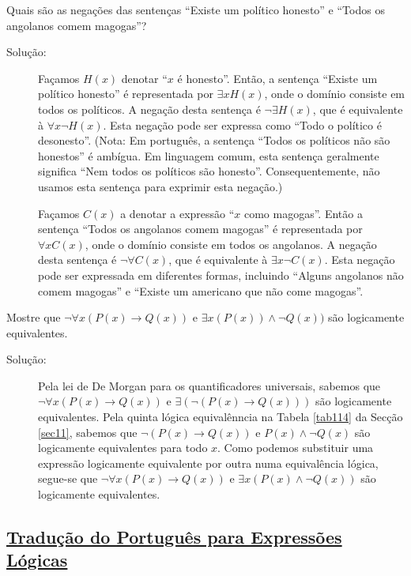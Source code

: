 \begin{exmp}
\label{exem144}
Quais são as negações das sentenças ``Existe um político honesto'' e ``Todos os
angolanos comem magogas''?
\begin{description}
\item[Solução:] Façamos $H(x)$ denotar ``$x$ é honesto''. Então, a sentença
``Existe um político honesto'' é representada por $\exists xH(x)$, onde o
domínio consiste em todos os políticos. A negação desta sentença é
$\lnot\exists H(x)$, que é equivalente à $\forall x\lnot H(x)$. Esta negação
pode ser expressa como ``Todo o político é desonesto''. (Nota: Em português, a
sentença ``Todos os políticos não são honestos'' é ambígua. Em linguagem comum,
esta sentença geralmente significa ``Nem todos os políticos são honesto''.
Consequentemente, não usamos esta sentença para exprimir esta negação.)


Façamos $C(x)$ a denotar a expressão ``$x$ como magogas''. Então a sentença
``Todos os angolanos comem magogas'' é representada por $\forall xC(x)$, onde o
domínio consiste em todos os angolanos. A negação desta sentença é $\lnot
\forall C(x)$, que é equivalente à $\exists x\lnot C(x)$. Esta negação pode ser
expressada em diferentes formas, incluindo ``Alguns angolanos não comem
magogas'' e ``Existe um americano que não come magogas''.
\end{description}
\end{exmp}

\begin{exmp}
\label{exem145}
Mostre que $\lnot \forall x(P(x) \to Q(x))$ e $\exists x(P(x)) \land \lnot
Q(x))$ são logicamente equivalentes.
\begin{description}
\item[Solução:]Pela lei de De Morgan para os quantificadores universais, sabemos
que $\lnot\forall x(P(x) \to Q(x))$ e $\exists (\lnot (P(x) \to Q(x)))$ são
logicamente equivalentes. Pela quinta lógica equivalênncia na Tabela
\ref{tab114} da Secção \ref{sec11}, sabemos que $\lnot(P(x) \to Q(x))$ e
$P(x) \land \lnot Q(x)$ são logicamente equivalentes para todo $x$. Como podemos
substituir uma expressão logicamente equivalente por outra numa equivalência
lógica, segue-se que $\lnot \forall x(P(x) \to Q(x))$ e $\exists x(P(x) \land
\lnot Q(x))$ são logicamente equivalentes.
\end{description}

\end{exmp}

\subsection*{\underline{Tradução do Português para Expressões Lógicas}}

